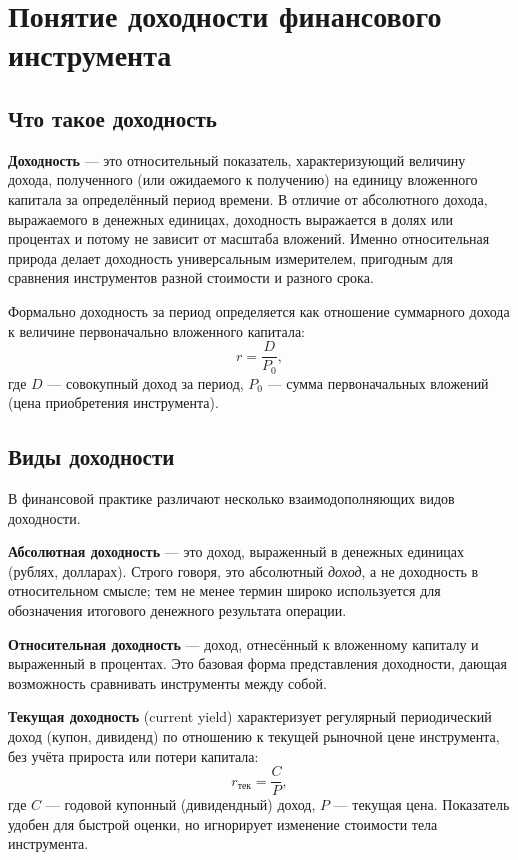 \documentclass[14pt, a4paper]{extarticle}
\begin{document}
\section{Понятие доходности финансового инструмента}

\subsection{Что такое доходность}

\textbf{Доходность} — это относительный показатель, характеризующий величину
дохода, полученного (или ожидаемого к получению) на единицу вложенного
капитала за определённый период времени. В отличие от абсолютного дохода,
выражаемого в денежных единицах, доходность выражается в долях или процентах и
потому не зависит от масштаба вложений. Именно относительная природа делает
доходность универсальным измерителем, пригодным для сравнения инструментов
разной стоимости и разного срока.

Формально доходность за период определяется как отношение суммарного дохода к
величине первоначально вложенного капитала:
\begin{equation}
  r = \frac{D}{P_0},
\end{equation}
где $D$ — совокупный доход за период, $P_0$ — сумма первоначальных вложений
(цена приобретения инструмента).

\subsection{Виды доходности}

В финансовой практике различают несколько взаимодополняющих видов доходности.

\textbf{Абсолютная доходность} — это доход, выраженный в денежных единицах
(рублях, долларах). Строго говоря, это абсолютный \emph{доход}, а не
доходность в относительном смысле; тем не менее термин широко используется для
обозначения итогового денежного результата операции.

\textbf{Относительная доходность} — доход, отнесённый к вложенному капиталу и
выраженный в процентах. Это базовая форма представления доходности, дающая
возможность сравнивать инструменты между собой.

\textbf{Текущая доходность} (current yield) характеризует регулярный
периодический доход (купон, дивиденд) по отношению к текущей рыночной цене
инструмента, без учёта прироста или потери капитала:
\begin{equation}
  r_{\text{тек}} = \frac{C}{P},
\end{equation}
где $C$ — годовой купонный (дивидендный) доход, $P$ — текущая цена. Показатель
удобен для быстрой оценки, но игнорирует изменение стоимости тела инструмента.
\end{document}
